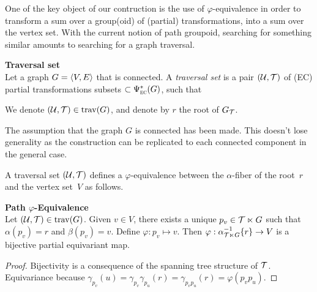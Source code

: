 One of the key object of our contruction is the use of $\varphi$-equivalence in order to transform a sum over a group(oid) of (partial) transformations, into a sum over the vertex set. With the current notion of path groupoid, searching for something similar amounts to searching for a graph traversal.

\begin{definition}\textbf{Traversal set}\\
Let a graph $G = \langle V, E \rangle$ that is connected. A \emph{traversal set} is a pair $(\mathcal{U}, \mathcal{T})$ of (EC) partial transformations subsets $\subset \Psi_{\operatorname{\textsc{ec}}}^*(G)$, such that
We denote $(\mathcal{U}, \mathcal{T}) \in \operatorname{trav}(G)$, and denote by $r$ the root of $G_{\mathcal{T}}$.
\end{definition}

\begin{remark}The assumption that the graph $G$ is connected has been made. This doesn't lose generality as the construction can be replicated to each connected component in the general case.
\end{remark}

A traversal set $(\mathcal{U}, \mathcal{T})$ defines a $\varphi$-equivalence between the $\alpha$-fiber of the root~$r$ and the vertex set~$V$ as follows.

\begin{lemma}\textbf{Path $\varphi$-Equivalence}\\
Let $(\mathcal{U}, \mathcal{T}) \in \operatorname{trav}(G)$. Given $v \in V$, there exists a unique $p_v \in \mathcal{T} \ltimes G$ such that $\alpha(p_v) = r$ and $\beta(p_v) = v$. Define $\varphi: p_v \mapsto v$. Then $\varphi: \alpha^{-1}_{\mathcal{T} \ltimes G}\{r\} \rightarrow V$ is a bijective partial equivariant map.
\end{lemma}
\begin{proof}
Bijectivity is a consequence of the spanning tree structure of $\mathcal{T}$.
Equivariance because $\gamma_{p_v}(u) = \gamma_{p_v}\gamma_{p_u}(r) = \gamma_{p_vp_u}(r) = \varphi(p_vp_u)$.
\end{proof}

